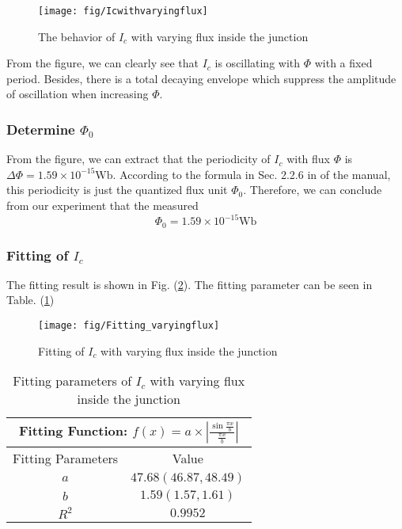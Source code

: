 \begin{figure}
\texttt{[image: fig/Icwithvaryingflux]}

\caption{The behavior of $I_{c}$ with varying flux inside the junction}

\label{Icwithvaryingflux}
\end{figure}
From the figure, we can clearly see that $I_{c}$ is oscillating with
$\Phi$ with a fixed period. Besides, there is a total decaying envelope
which suppress the amplitude of oscillation when increasing $\Phi$.

\subsubsection{Determine $\Phi_{0}$}

From the figure, we can extract that the periodicity of $I_{c}$ with
flux $\Phi$ is $\Delta\Phi=1.59\times10^{-15}\mathrm{Wb}$. According
to the formula in Sec. 2.2.6 in of the manual, this periodicity is
just the quantized flux unit $\Phi_{0}$. Therefore, we can conclude
from our experiment that the measured
\[
\Phi_{0}=1.59\times10^{-15}\mathrm{Wb}
\]


\subsubsection{Fitting of $I_{c}$}

The fitting result is shown in Fig. (\ref{Fitting_of_IC_varying_flux}).
The fitting parameter can be seen in Table. (\ref{fitting_parameter_table})

\begin{figure}
\texttt{[image: fig/Fitting\_varyingflux]}

\caption{Fitting of $I_{c}$ with varying flux inside the junction}

\label{Fitting_of_IC_varying_flux}
\end{figure}

\begin{table}
\begin{center}
\begin{tabular}{|c|c|}
\hline 
\multicolumn{2}{|c|}{Fitting Function: $f(x)=a\times|\frac{\sin\frac{\pi x}{b}}{\frac{\pi x}{b}}|$}\tabularnewline
\hline 
\hline 
Fitting Parameters & Value\tabularnewline
\hline 
$a$ & $47.68(46.87,48.49)$\tabularnewline
\hline 
$b$ & $1.59(1.57,1.61)$\tabularnewline
\hline 
$R^{2}$ & $0.9952$\tabularnewline
\hline 
\end{tabular}
\end{center}

\caption{Fitting parameters of $I_{c}$ with varying flux inside the junction}

\label{fitting_parameter_table}
\end{table}


